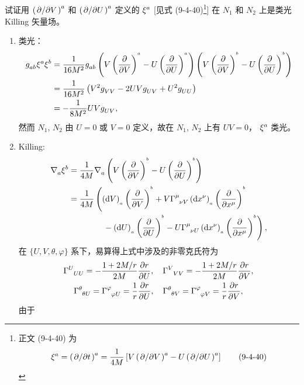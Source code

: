 \begin{xiti}
	\item 试证用 $\tensor{\left( \pdv*{V} \right)}{^a}$ 和 $\tensor{\left( \pdv*{U} \right)}{^a}$ 定义的 $\tensor{\xi}{^a}$ [见式 (9-4-40)\footnote{
		正文 (9-4-40) 为
		\begin{equation}
			\tensor{\xi}{^a} = \tensor{\left( \pdv*{t} \right)}{^a} = \frac{1}{4M} \left[ V \tensor{\left( \pdv*{V} \right)}{^a} - U \tensor{\left( \pdv*{U} \right)}{^a} \right] \tag{9-4-40}
		\end{equation}
	}] 在 $N_1$ 和 $N_2$ 上是类光 Killing 矢量场。
	\begin{zm}
		\begin{enumerate}
			\item 类光：
			\begin{align*}
				\tensor{g}{_a_b} \tensor{\xi}{^a} \tensor{\xi}{^b} &= \frac{1}{16M^2} \tensor{g}{_a_b} \left( V \tensorp{V}{^a} - U \tensorp{U}{^a} \right) \left( V \tensorp{V}{^b} - U \tensorp{U}{^b} \right)\\
				&= \frac{1}{16 M^2} \left( V^2 \tensor{g}{_V_V} -2UV \tensor{g}{_U_V} + U^2 \tensor{g}{_U_U} \right)\\
				&= - \frac{1}{8 M^2} UV \tensor{g}{_U_V},
			\end{align*}
			然而 $N_1$, $N_2$ 由 $U=0$ 或 $V=0$ 定义，故在 $N_1$, $N_2$ 上有 $UV=0$， $\tensor{\xi}{^a}$ 类光。
			\item Killing:
			\begin{align*}
				\Nabla{a} \tensor{\xi}{^b} &= \frac{1}{4M} \Nabla{a} \left( V \tensorp{V}{^b} - U \tensorp{U}{^b} \right)\\
				&= \frac{1}{4M} \left( \tensord{V}{_a} \tensorp{V}{^b} + V \ChristoffelSymbol{\mu}{\nu}{V} \tensord{x^\nu}{_a} \tensorp{x^\mu}{^b} \right.\\
				&\qquad\qquad \left. {}- \tensord{U}{_a} \tensorp{U}{^b} - U \ChristoffelSymbol{\mu}{\nu}{U} \tensord{x^\nu}{_a} \tensorp{x^\mu}{^b} \right),
			\end{align*}
			在 $\{U,V,\theta,\varphi\}$ 系下，易算得上式中涉及的非零克氏符为
			\begin{gather*}
				\ChristoffelSymbol{U}{U}{U} = - \frac{1+2M/r}{2M} \pdv{r}{U} \qc \ChristoffelSymbol{V}{V}{V} = - \frac{1+2M/r}{2M} \pdv{r}{V},\\
				\ChristoffelSymbol{\theta}{\theta}{U} = \ChristoffelSymbol{\varphi}{\varphi}{U} = \frac{1}{r} \pdv{r}{U} \qc \ChristoffelSymbol{\theta}{\theta}{V} = \ChristoffelSymbol{\varphi}{\varphi}{V} = \frac{1}{r} \pdv{r}{V},
			\end{gather*}
			由于

\end{enumerate}
\end{zm}
\end{xiti}
